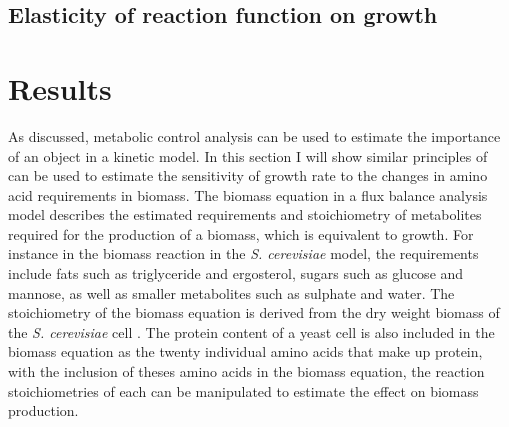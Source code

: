 \subsection{Elasticity of reaction function on growth}

\section{Results}

As discussed, metabolic control analysis can be used to estimate the importance of an object in a kinetic model. In this section I will show similar principles of can be used to estimate the sensitivity of growth rate to the changes in amino acid requirements in biomass. The biomass equation in a flux balance analysis model describes the estimated requirements and stoichiometry of metabolites required for the production of a biomass, which is equivalent to growth. For instance in the biomass reaction in the \emph{S. cerevisiae} model, the requirements include fats such as triglyceride and ergosterol, sugars such as glucose and mannose, as well as smaller metabolites such as sulphate and water. The stoichiometry of the biomass equation is derived from the dry weight biomass of the \emph{S. cerevisiae} cell \cite{duarte2004}. The protein content of a yeast cell is also included in the biomass equation as the twenty individual amino acids that make up protein, with the inclusion of theses amino acids in the biomass equation, the reaction stoichiometries of each can be manipulated to estimate the effect on biomass production.

\begin{figure}
  \hfill
  \hfill
  \hfill
  \hfill
  \label{figure:curve_estimation}
\end{figure}


